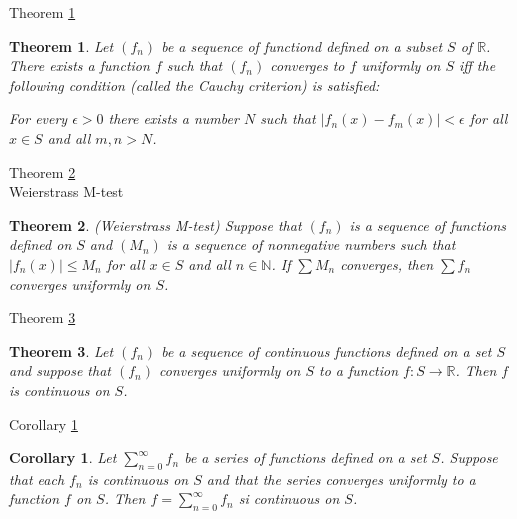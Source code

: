 \documentclass[avery5371,grid]{flashcards}
\newtheorem{corollary}{Corollary}
\newtheorem{theorem}{Theorem}
\newcommand{\bb}[1]{\mathbb{#1}}
\newcommand{\R}{\bb{R}}
\newcommand{\N}{\bb{N}}
\begin{document}
\begin{flashcard}[Theorem]{Theorem \ref{thm115}}
\begin{theorem}
\label{thm115}
Let $(f_n)$ be a sequence of functiond defined on a subset $S$
of $\R$.  There exists a function $f$ such that $(f_n)$ converges to $f$
uniformly on $S$ iff the following condition (called the Cauchy criterion) is
satisfied:

For every $\epsilon > 0$ there exists a number $N$ such that $|f_n(x) - f_m(x)|
< \epsilon$ for all $x \in S$ and all $m,n > N$.
\end{theorem}
\end{flashcard}

\begin{flashcard}[Theorem]{Theorem \ref{thm116}\\ Weierstrass M-test}
\begin{theorem}
\label{thm116}
(Weierstrass M-test)  Suppose that $(f_n)$ is a sequence of
functions defined on $S$ and $(M_n)$ is a sequence of nonnegative numbers such
that $|f_n(x)| \leq M_n$ for all $x \in S$ and all $n \in \N$.  If
$\displaystyle \sum M_n$ converges, then $\displaystyle \sum f_n$ converges
uniformly on $S$.
\end{theorem}
\end{flashcard}

\begin{flashcard}[Theorem]{Theorem \ref{thm117}}
\begin{theorem}
\label{thm117}
Let $(f_n)$ be a sequence of continuous functions defined on a
set $S$ and suppose that $(f_n)$ converges uniformly on $S$ to a function $f: S
\to \R$.  Then $f$ is continuous on $S$.
\end{theorem}
\end{flashcard}

\begin{flashcard}[Corollary]{Corollary \ref{cor8}}
\begin{corollary}
\label{cor8}
Let $\displaystyle \sum _{n=0}^{\infty} f_n$ be a series of
functions defined on a set $S$.  Suppose that each $f_n$ is continuous on $S$
and that the series converges uniformly to a function $f$ on $S$.  Then
$\displaystyle f = \sum _{n = 0} ^{\infty} f_n$ si continuous on $S$.
\end{corollary}
\end{flashcard}
\end{document}
